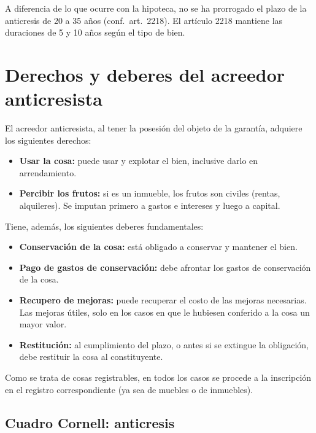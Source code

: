 \documentclass[12pt,oneside]{book}
\begin{document}
\begin{note}
A diferencia de lo que ocurre con la hipoteca, no se ha prorrogado el plazo de la anticresis de 20 a 35 años (conf.\ art.\ 2218). El artículo 2218 mantiene las duraciones de 5 y 10 años según el tipo de bien.
\end{note}

\section{Derechos y deberes del acreedor anticresista}

El acreedor anticresista, al tener la posesión del objeto de la garantía, adquiere los siguientes derechos:

\begin{itemize}
    \item \textbf{Usar la cosa:} puede usar y explotar el bien, inclusive darlo en arrendamiento.
    \item \textbf{Percibir los frutos:} si es un inmueble, los frutos son civiles (rentas, alquileres). Se imputan primero a gastos e intereses y luego a capital.
\end{itemize}

Tiene, además, los siguientes deberes fundamentales:

\begin{itemize}
    \item \textbf{Conservación de la cosa:} está obligado a conservar y mantener el bien.
    \item \textbf{Pago de gastos de conservación:} debe afrontar los gastos de conservación de la cosa.
    \item \textbf{Recupero de mejoras:} puede recuperar el costo de las mejoras necesarias. Las mejoras útiles, solo en los casos en que le hubiesen conferido a la cosa un mayor valor.
    \item \textbf{Restitución:} al cumplimiento del plazo, o antes si se extingue la obligación, debe restituir la cosa al constituyente.
\end{itemize}

Como se trata de cosas registrables, en todos los casos se procede a la inscripción en el registro correspondiente (ya sea de muebles o de inmuebles).

\subsection*{Cuadro Cornell: anticresis}
\end{document}
